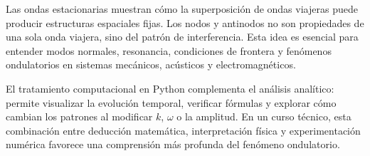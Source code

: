 \documentclass[
  letterpaper,
  DIV=11,
  numbers=noendperiod]{scrreprt}
\begin{document}
Las ondas estacionarias muestran cómo la superposición de ondas viajeras
puede producir estructuras espaciales fijas. Los nodos y antinodos no
son propiedades de una sola onda viajera, sino del patrón de
interferencia. Esta idea es esencial para entender modos normales,
resonancia, condiciones de frontera y fenómenos ondulatorios en sistemas
mecánicos, acústicos y electromagnéticos.

El tratamiento computacional en Python complementa el análisis
analítico: permite visualizar la evolución temporal, verificar fórmulas
y explorar cómo cambian los patrones al modificar \(k\), \(\omega\) o la
amplitud. En un curso técnico, esta combinación entre deducción
matemática, interpretación física y experimentación numérica favorece
una comprensión más profunda del fenómeno ondulatorio.
\end{document}
